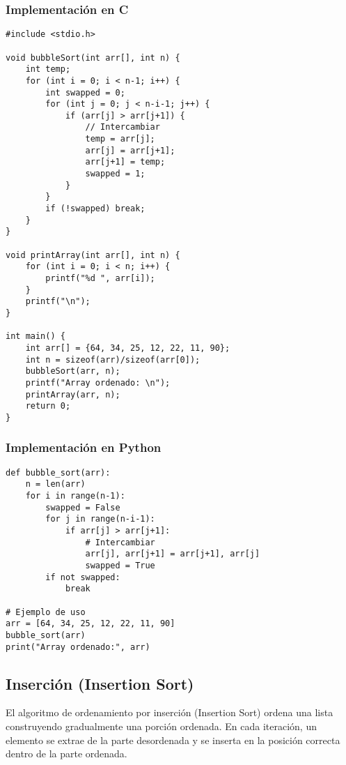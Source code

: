 \documentclass[11pt,openany]{book}
\begin{document}
\subsubsection{Implementación en C}
\lstset{language=C}
\begin{lstlisting}
#include <stdio.h>

void bubbleSort(int arr[], int n) {
    int temp;
    for (int i = 0; i < n-1; i++) {
        int swapped = 0;
        for (int j = 0; j < n-i-1; j++) {
            if (arr[j] > arr[j+1]) {
                // Intercambiar
                temp = arr[j];
                arr[j] = arr[j+1];
                arr[j+1] = temp;
                swapped = 1;
            }
        }
        if (!swapped) break;
    }
}

void printArray(int arr[], int n) {
    for (int i = 0; i < n; i++) {
        printf("%d ", arr[i]);
    }
    printf("\n");
}

int main() {
    int arr[] = {64, 34, 25, 12, 22, 11, 90};
    int n = sizeof(arr)/sizeof(arr[0]);
    bubbleSort(arr, n);
    printf("Array ordenado: \n");
    printArray(arr, n);
    return 0;
}
\end{lstlisting}

\subsubsection{Implementación en Python}
\lstset{language=Python}
\begin{lstlisting}
def bubble_sort(arr):
    n = len(arr)
    for i in range(n-1):
        swapped = False
        for j in range(n-i-1):
            if arr[j] > arr[j+1]:
                # Intercambiar
                arr[j], arr[j+1] = arr[j+1], arr[j]
                swapped = True
        if not swapped:
            break

# Ejemplo de uso
arr = [64, 34, 25, 12, 22, 11, 90]
bubble_sort(arr)
print("Array ordenado:", arr)
\end{lstlisting}


\subsection{Inserción (Insertion Sort)}

El algoritmo de ordenamiento por inserción (Insertion Sort) ordena una lista construyendo gradualmente una porción ordenada. En cada iteración, un elemento se extrae de la parte desordenada y se inserta en la posición correcta dentro de la parte ordenada.
\end{document}
